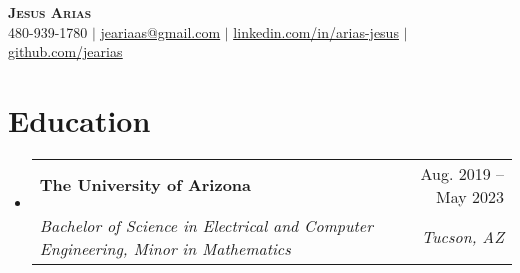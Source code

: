 \documentclass[letterpaper,11pt]{article}
\makeatletter
\newcommand{\resumeSubheading}[4]{
  \vspace{-2pt}\item
    \begin{tabular*}{0.97\textwidth}[t]{l@{\extracolsep{\fill}}r}
      \textbf{#1} & #2 \\
      \textit{\small#3} & \textit{\small #4} \\
    \end{tabular*}\vspace{-7pt}
}
\newcommand{\resumeSubHeadingListStart}{\begin{itemize}[leftmargin=0.15in, label={}]}
\newcommand{\resumeSubHeadingListEnd}{\end{itemize}}
\makeatother
\begin{document}

\begin{center}
    \textbf{\Huge \scshape Jesus Arias} \\ \vspace{1pt}
    \small 480-939-1780 $|$ \href{mailto:x@x.com}{\underline{jeariaas@gmail.com}} $|$ 
    \href{https://linkedin.com/in/...}{\underline{linkedin.com/in/arias-jesus}} $|$
    \href{https://github.com/...}{\underline{github.com/jearias}}
\end{center}


\section{Education}
  \resumeSubHeadingListStart
    \resumeSubheading
      {The University of Arizona}{Aug. 2019 -- May 2023}
      {Bachelor of Science in Electrical and Computer Engineering, Minor in Mathematics}{Tucson, AZ}
  \resumeSubHeadingListEnd


\end{document}
